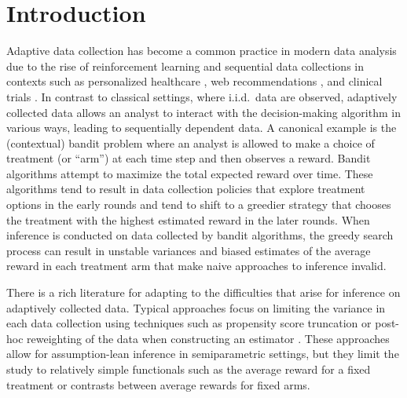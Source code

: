 \documentclass[11pt]{article}
\begin{document}
\section{Introduction}
Adaptive data collection has become a common practice in modern data analysis due to the rise of reinforcement learning and sequential data collections in contexts such as personalized healthcare \citep{info:doi/10.2196/jmir.7994}, web recommendations \citep{afsar2022reinforcement}, and clinical trials \citep{https://doi.org/10.1002/sim.3720,info:doi/10.2196/18477}. In contrast to classical settings, where i.i.d.\ data are observed, adaptively collected data allows an analyst to interact with the decision-making algorithm in various ways, leading to sequentially dependent data. A canonical example is the (contextual) bandit problem where an analyst is allowed to make a choice of treatment (or ``arm'') at each time step and then observes a reward. Bandit algorithms attempt to maximize the total expected reward over time. These algorithms tend to result in data collection policies that explore treatment options in the early rounds and tend to shift to a greedier strategy that chooses the treatment with the highest estimated reward in the later rounds. When inference is conducted on data collected by bandit algorithms, the greedy search process can result in unstable variances \citep{pmlr-v80-deshpande18a,NEURIPS2020_6fd86e0a} and biased estimates of the average reward in each treatment arm \citep{NEURIPS2019_65b1e92c} that make naive approaches to inference invalid. 

There is a rich literature for adapting to the difficulties that arise for inference on adaptively collected data. Typical approaches focus on limiting the variance in each data collection using techniques such as propensity score truncation \citep{cook2023semiparametric} or post-hoc reweighting of the data when constructing an estimator \citep{bibault2021postcontext,syrgkanis2024postreinforcementlearninginference}. These approaches allow for assumption-lean inference in semiparametric settings, but they limit the study to relatively simple functionals such as the average reward for a fixed treatment or contrasts between average rewards for fixed arms. 
\end{document}

